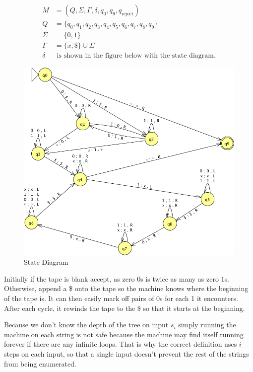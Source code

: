 \begin{problem}{2}
  \begin{solution}
    \begin{align*}
      M &= (Q, \Sigma, \Gamma, \delta, q_0, q_9,q_{\text{reject}}) \\
      Q &= \{ q_0,q_1,q_2,q_3,q_4,q_5,q_6,q_7,q_8,q_9 \} \\
      \Sigma &= \{ 0, 1 \}\\
      \Gamma &= \{ x, \$ \} \cup \Sigma \\
      \delta &\text{ is shown in the figure below with the state diagram.}
    \end{align*}
    \begin{figure}[H]
      \centering
      \caption{State Diagram}
      \includegraphics[scale=.6]{problem_2.png}
    \end{figure}
    Initially if the tape is blank accept, as zero $0$s is twice as many as zero $1$s. Otherwise, append a \$ onto the
    tape so the machine knows where the beginning of the tape is. It can then easily mark off pairs of 0s for each 1 it
    encounters. After each cycle, it rewinds the tape to the \$ so that it starts at the beginning.
  \end{solution}
\end{problem}

\begin{problem}{3}
  \begin{solution}
    Because we don't know the depth of the tree on input $s_i$ simply running the machine on each string is not safe
    because the machine may find itself running forever if there are any infinite loops. That is why the correct
    definition uses $i$ steps on each input, so that a single input doesn't prevent the rest of the strings from being
    enumerated.
  \end{solution}
\end{problem}


